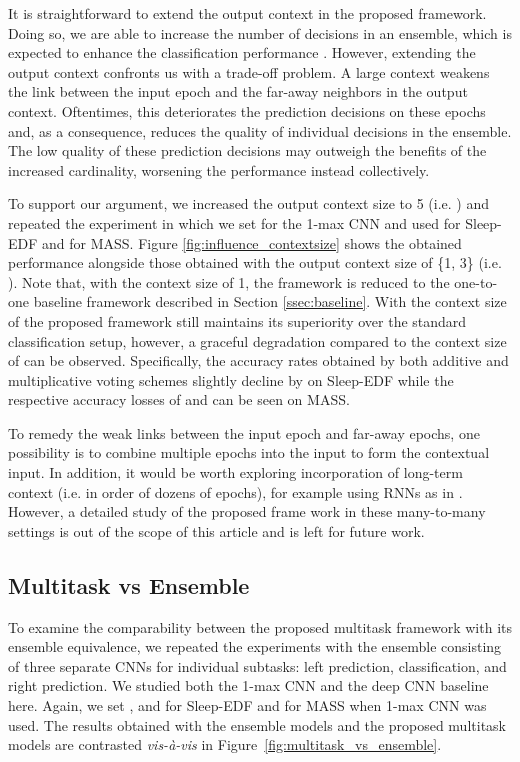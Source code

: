 \documentclass[10pt,twocolumn,twoside]{IEEEtran}
\begin{document}
It is straightforward to extend the output context in the proposed framework. Doing so, we are able to increase the number of decisions in an ensemble, which is expected to enhance the classification performance \cite{Hinton2015}. However, extending the output context confronts us with a trade-off problem. A large context weakens the link between the input epoch and the far-away neighbors in the output context. Oftentimes, this deteriorates the prediction decisions on these epochs and, as a consequence, reduces the quality of individual decisions in the ensemble. The low quality of these prediction decisions may outweigh the benefits of the increased cardinality, worsening the performance instead collectively.

To support our argument, we increased the output context size to 5 (i.e. ) and repeated the experiment in which we set  for the 1-max CNN and used  for Sleep-EDF and  for MASS.
Figure \ref{fig:influence_contextsize} shows the obtained performance alongside those obtained with the output context size of \{1, 3\} (i.e. ). Note that, with the context size of 1, the framework is reduced to the one-to-one baseline framework described in Section \ref{ssec:baseline}. With the context size of  the proposed framework still maintains its superiority over the standard classification setup, however, a graceful degradation compared to the context size of  can be observed. Specifically, the accuracy rates obtained by both additive and multiplicative voting schemes slightly decline by  on Sleep-EDF while the respective accuracy losses of  and  can be seen on MASS.

To remedy the weak links between the input epoch and far-away epochs, one possibility is to combine multiple epochs into the input to form the contextual input. In addition, it would be worth exploring incorporation of long-term context (i.e. in order of dozens of epochs), for example using RNNs as in \cite{Supratak2017,Stephansen2017}. However, a detailed study of the proposed frame work in these many-to-many settings is out of the scope of this article and is left for future work.

\subsection{Multitask vs Ensemble}

To examine the comparability between the proposed multitask framework with its ensemble equivalence, we repeated the experiments with the ensemble consisting of three separate CNNs for individual subtasks: left prediction, classification, and right prediction. We studied both the 1-max CNN and the deep CNN baseline here. Again, we set , and  for Sleep-EDF and  for MASS when 1-max CNN was used. The results obtained with the ensemble models and the proposed multitask models are contrasted \emph{vis-\`{a}-vis} in Figure~\ref{fig:multitask_vs_ensemble}.
\end{document}
